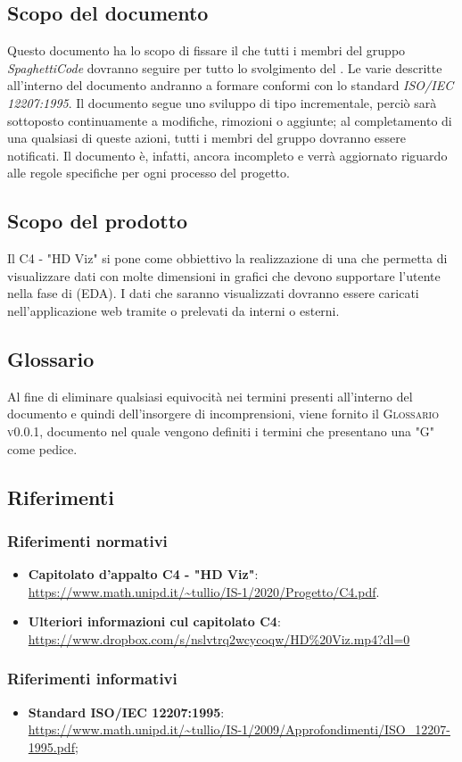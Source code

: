 \documentclass[../norme-di-progetto.tex]{subfiles}
\begin{document}
\subsection{Scopo del documento}
Questo documento ha lo scopo di fissare il  che tutti i membri del gruppo \emph{SpaghettiCode} dovranno seguire per tutto lo svolgimento del .
Le varie  descritte all'interno del documento andranno a formare  conformi con lo standard \emph{ISO/IEC 12207:1995}.
Il documento segue uno sviluppo di tipo incrementale, perciò sarà sottoposto continuamente a modifiche, rimozioni o aggiunte; al completamento di una qualsiasi di queste azioni, tutti i membri del gruppo dovranno essere notificati. Il documento è, infatti, ancora incompleto e verrà aggiornato riguardo alle regole specifiche per ogni processo del progetto.

\subsection{Scopo del prodotto}
Il  C4 - "HD Viz" si pone come obbiettivo la realizzazione di una  che permetta di visualizzare dati con molte dimensioni in grafici che devono supportare l'utente nella fase di  (EDA).
I dati che saranno visualizzati dovranno essere caricati nell'applicazione web tramite  o prelevati da  interni o esterni.

\subsection{Glossario}
Al fine di eliminare qualsiasi equivocità nei termini presenti all'interno del documento e quindi dell'insorgere di incomprensioni, viene fornito il \textsc{Glossario v0.0.1}, documento nel quale vengono definiti i termini che presentano una "G" come pedice.

\subsection{Riferimenti}
\subsubsection{Riferimenti normativi}
\begin{itemize}
    \item \textbf{Capitolato d'appalto C4 - "HD Viz"}: \\ \url{https://www.math.unipd.it/~tullio/IS-1/2020/Progetto/C4.pdf}.
    
    \item \textbf{Ulteriori informazioni cul capitolato C4}: \\
    \url{https://www.dropbox.com/s/nslvtrq2wcycoqw/HD\%20Viz.mp4?dl=0}
\end{itemize}

\subsubsection{Riferimenti informativi}
\begin{itemize}
    \item \textbf{Standard ISO/IEC 12207:1995}: \\ \url{https://www.math.unipd.it/~tullio/IS-1/2009/Approfondimenti/ISO_12207-1995.pdf};
\end{itemize}
\end{document}
